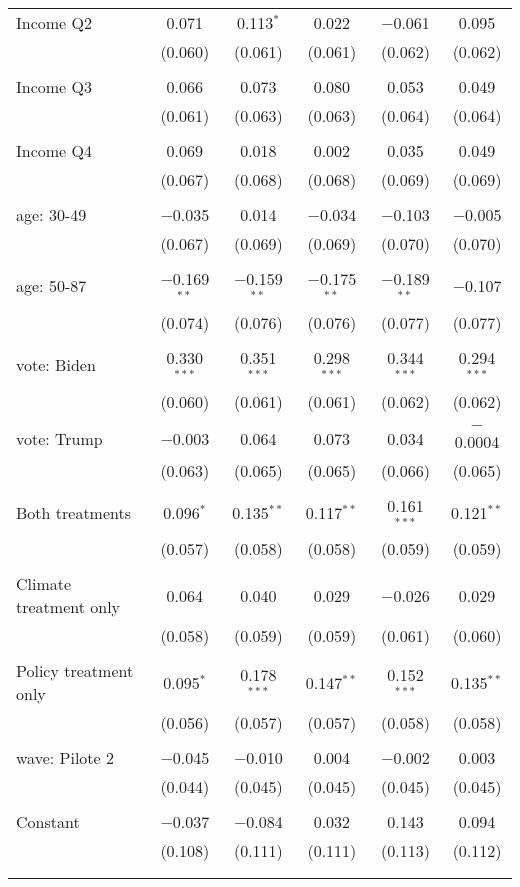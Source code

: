 \begin{tabular}{@{\extracolsep{5pt}}lccccc}
 Income Q2 & 0.071 & 0.113$^{*}$ & 0.022 & $-$0.061 & 0.095 \\ 
  & (0.060) & (0.061) & (0.061) & (0.062) & (0.062) \\ 
  & & & & & \\ 
 Income Q3 & 0.066 & 0.073 & 0.080 & 0.053 & 0.049 \\ 
  & (0.061) & (0.063) & (0.063) & (0.064) & (0.064) \\ 
  & & & & & \\ 
 Income Q4 & 0.069 & 0.018 & 0.002 & 0.035 & 0.049 \\ 
  & (0.067) & (0.068) & (0.068) & (0.069) & (0.069) \\ 
  & & & & & \\ 
 age: 30-49 & $-$0.035 & 0.014 & $-$0.034 & $-$0.103 & $-$0.005 \\ 
  & (0.067) & (0.069) & (0.069) & (0.070) & (0.070) \\ 
  & & & & & \\ 
 age: 50-87 & $-$0.169$^{**}$ & $-$0.159$^{**}$ & $-$0.175$^{**}$ & $-$0.189$^{**}$ & $-$0.107 \\ 
  & (0.074) & (0.076) & (0.076) & (0.077) & (0.077) \\ 
  & & & & & \\ 
 vote: Biden & 0.330$^{***}$ & 0.351$^{***}$ & 0.298$^{***}$ & 0.344$^{***}$ & 0.294$^{***}$ \\ 
  & (0.060) & (0.061) & (0.061) & (0.062) & (0.062) \\ 
  & & & & & \\ 
 vote: Trump & $-$0.003 & 0.064 & 0.073 & 0.034 & $-$0.0004 \\ 
  & (0.063) & (0.065) & (0.065) & (0.066) & (0.065) \\ 
  & & & & & \\ 
 Both treatments & 0.096$^{*}$ & 0.135$^{**}$ & 0.117$^{**}$ & 0.161$^{***}$ & 0.121$^{**}$ \\ 
  & (0.057) & (0.058) & (0.058) & (0.059) & (0.059) \\ 
  & & & & & \\ 
 Climate treatment only & 0.064 & 0.040 & 0.029 & $-$0.026 & 0.029 \\ 
  & (0.058) & (0.059) & (0.059) & (0.061) & (0.060) \\ 
  & & & & & \\ 
 Policy treatment only & 0.095$^{*}$ & 0.178$^{***}$ & 0.147$^{**}$ & 0.152$^{***}$ & 0.135$^{**}$ \\ 
  & (0.056) & (0.057) & (0.057) & (0.058) & (0.058) \\ 
  & & & & & \\ 
 wave: Pilote 2 & $-$0.045 & $-$0.010 & 0.004 & $-$0.002 & 0.003 \\ 
  & (0.044) & (0.045) & (0.045) & (0.045) & (0.045) \\ 
  & & & & & \\ 
 Constant & $-$0.037 & $-$0.084 & 0.032 & 0.143 & 0.094 \\ 
  & (0.108) & (0.111) & (0.111) & (0.113) & (0.112) \\ 
  & & & & & \\ 
\hline \\[-1.8ex] 


\end{tabular}

